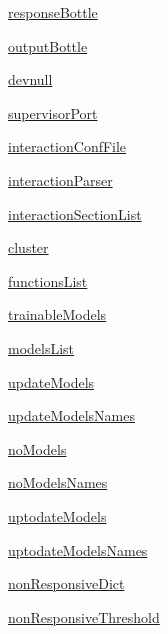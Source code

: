 \begin{DoxyCompactItemize}
\item 
\hyperlink{group__icubclient__SAM__Core_add9f8550aba87f676e631205abb6185b}{response\+Bottle}
\item 
\hyperlink{group__icubclient__SAM__Core_adf69aea6c79da57852e8698d6db841a9}{output\+Bottle}
\item 
\hyperlink{group__icubclient__SAM__Core_a0f818c25429085260fb61ff0338489d7}{devnull}
\item 
\hyperlink{group__icubclient__SAM__Core_a3a53f238ae79c0283c0ce5d700ef9831}{supervisor\+Port}
\item 
\hyperlink{group__icubclient__SAM__Core_aedc660c74de26833c3c17a0768973737}{interaction\+Conf\+File}
\item 
\hyperlink{group__icubclient__SAM__Core_a8450f979d388be4f1227cca520d8c886}{interaction\+Parser}
\item 
\hyperlink{group__icubclient__SAM__Core_ae5147c98dde8c75e4956b86ad9c4bb86}{interaction\+Section\+List}
\item 
\hyperlink{group__icubclient__SAM__Core_a386484b97af2371fe0d9a726057d432d}{cluster}
\item 
\hyperlink{group__icubclient__SAM__Core_a832c4e7d5e294bba47d86b9efbcbe15f}{functions\+List}
\item 
\hyperlink{group__icubclient__SAM__Core_a218e47e2a50ad7c5506c3305b74e1891}{trainable\+Models}
\item 
\hyperlink{group__icubclient__SAM__Core_ad1989cd242f29aba90fcd09ca1f13474}{models\+List}
\item 
\hyperlink{group__icubclient__SAM__Core_a97d9c6ae853b2a52ced0ebff4f0188cf}{update\+Models}
\item 
\hyperlink{group__icubclient__SAM__Core_a66db00bbd5eee3ba3bf438dfa20dc62b}{update\+Models\+Names}
\item 
\hyperlink{group__icubclient__SAM__Core_a0de882daa85e14c31570ee883bdb11c7}{no\+Models}
\item 
\hyperlink{group__icubclient__SAM__Core_afb37f2a7bcab850f82e7c635d5902a4e}{no\+Models\+Names}
\item 
\hyperlink{group__icubclient__SAM__Core_a08a274ec6bef905303a909f2df6c7e54}{uptodate\+Models}
\item 
\hyperlink{group__icubclient__SAM__Core_ac6cbc9336261887419abccae4b3a2ce1}{uptodate\+Models\+Names}
\item 
\hyperlink{group__icubclient__SAM__Core_a0f64f8e977cf13181daff3bfa840bc8d}{non\+Responsive\+Dict}
\item 
\hyperlink{group__icubclient__SAM__Core_a0260b89068af15e8eac571c46d1f1405}{non\+Responsive\+Threshold}

\end{DoxyCompactItemize}
